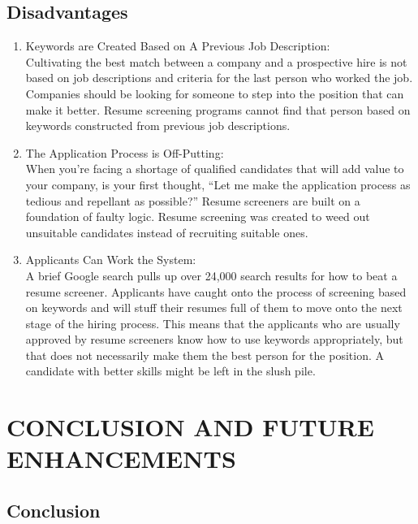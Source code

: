 \documentclass[12 pt, oneside]{book}
\begin{document}
\section{Disadvantages}
\begin{enumerate}
\item Keywords are Created Based on A Previous Job Description:\\
Cultivating the best match between a company and a prospective hire is not based on job descriptions and criteria for the last person who worked the job. Companies should be looking for someone to step into the position that can make it better. Resume screening programs cannot find that person based on keywords constructed from previous job descriptions.

\item The Application Process is Off-Putting:\\
When you’re facing a shortage of qualified candidates that will add value to your company, is your first thought, “Let me make the application process as tedious and repellant as possible?” Resume screeners are built on a foundation of faulty logic. Resume screening was created to weed out unsuitable candidates instead of recruiting suitable ones.

\item Applicants Can Work the System:\\
A brief Google search pulls up over 24,000 search results for how to beat a resume screener. Applicants have caught onto the process of screening based on keywords and will stuff their resumes full of them to move onto the next stage of the hiring process. This means that the applicants who are usually approved by resume screeners know how to use keywords appropriately, but that does not necessarily make them the best person for the position. A candidate with better skills might be left in the slush pile.

\end{enumerate}


\chapter{CONCLUSION AND FUTURE ENHANCEMENTS}
\section{Conclusion}
\end{document}
